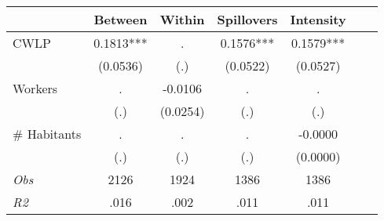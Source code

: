\begin{tabular}{l*{6}{c}}\hline&\multicolumn{1}{c}{Between}&\multicolumn{1}{c}{Within}&\multicolumn{1}{c}{Spillovers}&\multicolumn{1}{c}{Intensity}\\ \hline 
CWLP & 0.1813*** & . & 0.1576*** & 0.1579*** \\
 & (0.0536) & (.) & (0.0522) & (0.0527) \\
Workers & . & -0.0106 & . & . \\
 & (.) & (0.0254) & (.) & (.) \\
\# Habitants & . & . & . & -0.0000 \\
  & (.) & (.) & (.) & (0.0000) \\
\hline \textit{Obs} & 2126 & 1924 & 1386 & 1386  \\ \textit{R2} & .016 & .002 & .011 & .011 \\ \hline \end{tabular}
